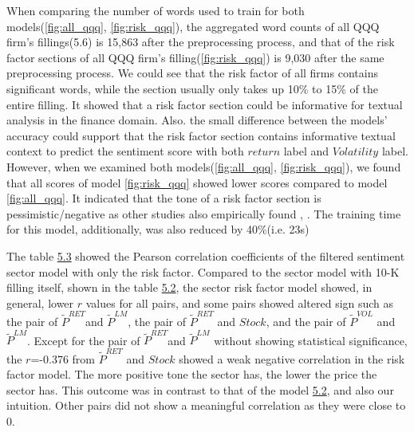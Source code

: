 \documentclass[logo,bsc,singlespacing,parskip]{infthesis}
\begin{document}
When comparing the number of words used to train for both models(\ref{fig:all_qqq}, \ref{fig:risk_qqq}), the aggregated word counts of all QQQ firm’s fillings(5.6) is 15,863 after the preprocessing process, and that of the risk factor sections of all QQQ firm’s filling(\ref{fig:risk_qqq}) is 9,030 after the same preprocessing process. We could see that the risk factor of all firms contains significant words, while the section usually only takes up 10\% to 15\% of the entire filling. It showed that a risk factor section could be informative for textual analysis in the finance domain. Also. the small difference between the models’ accuracy could support that the risk factor section contains informative textual context to predict the sentiment score with both $return$ label and $Volatility$  label. However, when we examined both models(\ref{fig:all_qqq}, \ref{fig:risk_qqq}), we found that all scores of model \ref{fig:risk_qqq} showed lower scores compared to model \ref{fig:all_qqq}. It indicated that the tone of a risk factor section is pessimistic/negative as other studies also empirically found \cite{campbelletal2014a}, \cite{Filzen2015}. The training time for this model, additionally, was also reduced by 40\%(i.e. 23s)

The table \hyperref[tab:risk_qqq_corr]{5.3} showed the Pearson correlation coefficients of the filtered sentiment sector model with only the risk factor. Compared to the sector model with 10-K filling itself, shown in the table \hyperref[tab:all_qqq_corr2]{5.2}, the sector risk factor model showed, in general, lower $r$ values for all pairs, and some pairs showed altered sign such as the pair of $\tilde{P}^{RET}$and $\tilde{P}^{LM}$, the pair of $\tilde{P}^{RET}$ and $Stock$, and the pair of $\tilde{P}^{VOL}$ and $\tilde{P}^{LM}$. Except for the pair of $\tilde{P}^{RET}$and $\tilde{P}^{LM}$ without showing statistical significance, the $r$=-0.376 from $\tilde{P}^{RET}$ and $Stock$ showed a weak negative correlation in the risk factor model. The more positive tone the sector has, the lower the price the sector has. This outcome was in contrast to that of the model \hyperref[tab:all_qqq_corr2]{5.2}, and also our intuition. Other pairs did not show a meaningful correlation as they were close to 0.
\end{document}
